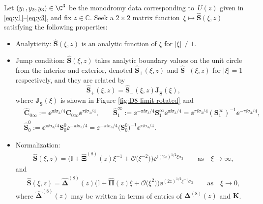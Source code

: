 \begin{rhp}
Let $(y_1,y_2, y_3) \in \C^3$ be the monodromy data corresponding to~$U(z)$ given in \eqref{eq:y1}--\eqref{eq:y3}, and fix $z\in\mathbb{C}$. Seek a $2\times 2$ matrix function~${\xi\mapsto\widehat{\mathbf{S}}(\xi, z)}$ satisfying the following properties:
\begin{itemize}\itemsep=0pt
 \item Analyticity: $\widehat{\mathbf{S}}(\xi, z)$ is an analytic function of $\xi$ for $|\xi|\neq 1$.
 \item Jump condition:
 $\widehat{\mathbf{S}}(\xi, z)$ takes analytic boundary values on the unit circle from the interior and exterior, denoted $\widehat{\mathbf{S}}_+(\xi,z)$ and $\widehat{\mathbf{S}}_-(\xi,z)$ for $|\xi|=1$ respectively, and they are related by
 \begin{equation*}
 \widehat{\mathbf{S}}_+(\xi,z)=\widehat{\mathbf{S}}_-(\xi,z) \mathbf J_{\widehat{\mathbf{S}}}(\xi),
 \end{equation*}
 where $\mathbf J_{\widehat{\mathbf{S}}}(\xi)$ is shown in Figure {\rm\ref{fig:D8-limit-rotated}} and
 \begin{align}
 &\widehat{\mathbf C}_{0\infty} := \ee^{\pi \ii \sigma_3/4} \mathbf C_{0\infty}\ee^{\pi \ii \sigma_3/4}, \qquad
 \widehat{\mathbf S}_1^\infty := \ee^{-\pi \ii \sigma_3/4} {\mathbf S}_1^\infty \ee^{\pi \ii \sigma_3/4} = \ee^{\pi \ii \sigma_3/4} ({\mathbf S}_1^\infty)^{-1} \ee^{-\pi \ii \sigma_3/4}, \nonumber\\
 & \widehat{\mathbf{S}}_0^0:= \ee^{\pi \ii \sigma_3/4} {\mathbf S}_0^0 \ee^{-\pi \ii \sigma_3/4} = \ee^{-\pi \ii \sigma_3/4} \big({\mathbf S}_0^0\big)^{-1} \ee^{\pi \ii \sigma_3/4}. \label{eq:hat-jumps}
 \end{align}
 \item Normalization:
\begin{gather}\label{eq:s-hat-norm-inf}\widehat{\mathbf{S}}(\xi,z) = \big(\mathbb{I} +\widehat{\mathbf{\Xi}}^{(8)}(z)\xi^{-1}+ \mathcal{O}\big(\xi^{-2}\big) \big) \ee^{\ii (2z)^{1/2} \xi \sigma_3 } \qquad \text{as} \quad \xi \to \infty,
\end{gather}
 and
\begin{gather}
\widehat{\mathbf{S}}(\xi,z) = \widehat{\mathbf{\Delta}}^{(8)}(z) \big(\mathbb{I} + \widehat{\mathbf{\Pi}}(z)\xi+\mathcal{O}\big(\xi^2\big) \big) \ee^{ (2z)^{1/2} \xi^{-1} \sigma_3 } \qquad \text{as} \quad \xi \to 0,\label{eq:s-hat-norm-zero}
\end{gather}
 where $\widehat{\mathbf{\Delta}}^{(8)}(z)$ may be written in terms of entries of $\mathbf{\Delta}^{(8)}(z)$ and $\mathbf{K}$.
\end{itemize}
\label{rhp:S-hat}
\end{rhp}
